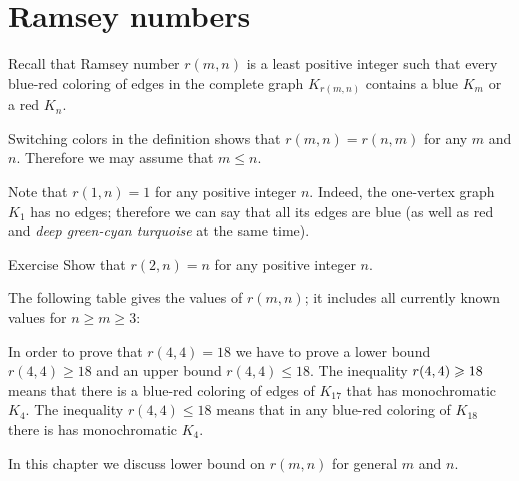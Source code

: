 \chapter{Ramsey numbers}

Recall that Ramsey number $r(m,n)$ is a least positive integer such that every blue-red coloring of edges in the complete graph $K_{r(m, n)}$ contains a blue $K_m$ or a red $K_n$.

Switching colors in the definition shows that $r(m,n)=r(n,m)$ for any $m$ and $n$.
Therefore we may assume that $m\le n$.

Note that $r(1,n)=1$ for any positive integer $n$.
Indeed, the one-vertex graph $K_1$ has no edges;
therefore we can say that all its edges are blue (as well as red and \emph{deep green-cyan turquoise} at the same time).

\begin{thm}{Exercise}
Show that $r(2,n)=n$ for any positive integer $n$.
\end{thm}

The following table gives the values of $r(m,n)$;
it includes all currently known values for $n\ge m\ge 3$:

\begin{table}[h!]\label{ramsey-table}
%
\end{table}

In order to prove that $r(4,4)=18$ we have to prove a lower bound $r(4,4)\ge 18$ and an upper bound $r(4,4)\le 18$.
The inequality $r(4,4)\z\ge 18$ means that there is a blue-red coloring of edges of $K_{17}$ that has monochromatic $K_4$.
The inequality $r(4,4)\le 18$ means that in any blue-red coloring of $K_{18}$ there is has monochromatic $K_4$.

In this chapter we discuss lower bound on $r(m,n)$ for general $m$ and $n$. 

